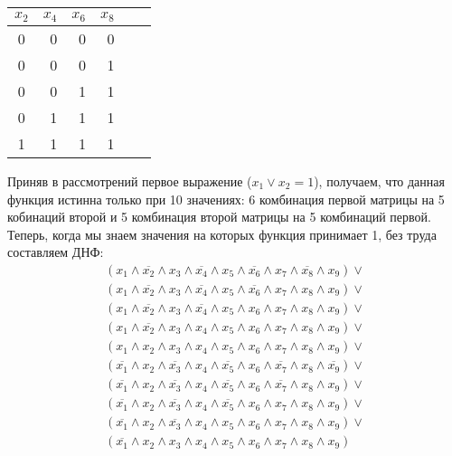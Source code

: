 \documentclass[12pt,a4paper]{scrartcl}
\begin{document}
\begin{center}
	\begin{tabular}{crrrrr}
		$x_2$ & $x_4$ & $x_6$ & $x_8$\\
		\hline
		0 & 0 & 0 & 0 \\
		0 & 0 & 0 & 1 \\
		0 & 0 & 1 & 1 \\
		0 & 1 & 1 & 1 \\
		1 & 1 & 1 & 1 \\
	\end{tabular}
\end{center}
Приняв в рассмотрений первое выражение ($x_1 \vee x_2 = 1 $), получаем, что данная функция истинна только при 10 значениях: 6 комбинация первой матрицы на 5 кобинаций второй и 5 комбинация второй матрицы на 5 комбинаций первой. Теперь, когда мы знаем значения на которых функция принимает 1, без труда составляем ДНФ:\\
\begin{gather*}
	(x_1 \wedge \overline{x_2} \wedge x_3 \wedge \overline{x_4} \wedge x_5 \wedge \overline{x_6} \wedge x_7 \wedge \overline{x_8} \wedge x_9) \vee \\
	(x_1 \wedge \overline{x_2} \wedge x_3 \wedge \overline{x_4} \wedge x_5 \wedge \overline{x_6} \wedge x_7 \wedge x_8 \wedge x_9) \vee \\
	(x_1 \wedge \overline{x_2} \wedge x_3 \wedge \overline{x_4} \wedge x_5 \wedge x_6 \wedge x_7 \wedge x_8 \wedge x_9) \vee \\
	(x_1 \wedge \overline{x_2} \wedge x_3 \wedge x_4 \wedge x_5 \wedge x_6 \wedge x_7 \wedge x_8 \wedge x_9) \vee \\
	(x_1 \wedge x_2 \wedge x_3 \wedge x_4 \wedge x_5 \wedge x_6 \wedge x_7 \wedge x_8 \wedge x_9) \vee \\
	(\overline{x_1} \wedge x_2 \wedge \overline{x_3} \wedge x_4 \wedge \overline{x_5} \wedge x_6 \wedge \overline{x_7} \wedge x_8 \wedge \overline{x_9}) \vee \\
	(\overline{x_1} \wedge x_2 \wedge \overline{x_3} \wedge x_4 \wedge \overline{x_5} \wedge x_6 \wedge \overline{x_7} \wedge x_8 \wedge x_9) \vee \\
	(\overline{x_1} \wedge x_2 \wedge \overline{x_3} \wedge x_4 \wedge \overline{x_5} \wedge x_6 \wedge x_7 \wedge x_8 \wedge x_9) \vee \\
	(\overline{x_1} \wedge x_2 \wedge \overline{x_3} \wedge x_4 \wedge x_5 \wedge x_6 \wedge x_7 \wedge x_8 \wedge x_9) \vee \\
	(\overline{x_1} \wedge x_2 \wedge x_3 \wedge x_4 \wedge x_5 \wedge x_6 \wedge x_7 \wedge x_8 \wedge x_9) 
\end{gather*}
\\ \\ \\
\end{document}
